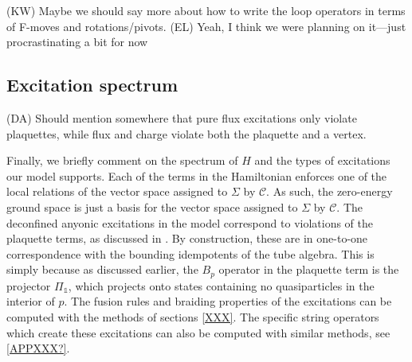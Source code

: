 \documentclass[12pt,a4paper]{article}
\newcounter{arrow}
\newcommand{\unit}{\mathds{1}}
\newcommand{\mcc}{\mathcal{C}}
\newcommand{\kw}[1]{{\color{kwcolor}\footnotesize{(KW) #1}}}
\newcommand{\dave}[1]{{\color{ao(english)}\footnotesize{(DA) #1}}}
\newcommand{\ethan}[1]{{\color{amethyst}\footnotesize{(EL) #1}}}
\newcommand{\Bpa}{\mathord{\vcenter{\hbox{\texttt{[image: Bpa.pdf]}}}}}
\newcommand{\Bpb}{\mathord{\vcenter{\hbox{\texttt{[image: Bpb.pdf]}}}}}
\newcommand{\Bpc}{\mathord{\vcenter{\hbox{\texttt{[image: Bpc.pdf]}}}}}
\newcommand{\Bpd}{\mathord{\vcenter{\hbox{\texttt{[image: Bpd.pdf]}}}}}
\newcommand{\Bpe}{\mathord{\vcenter{\hbox{\texttt{[image: Bpe.pdf]}}}}}
\newcommand{\Bpf}{\mathord{\vcenter{\hbox{\texttt{[image: Bpf.pdf]}}}}}
\newcommand{\Bpg}{\mathord{\vcenter{\hbox{\texttt{[image: Bpg.pdf]}}}}}
\newcommand{\Bph}{\mathord{\vcenter{\hbox{\texttt{[image: Bph.pdf]}}}}}
\newcommand{\Bpi}{\mathord{\vcenter{\hbox{\texttt{[image: Bpi.pdf]}}}}}
\newcommand{\PlaquettePrime}{\mathord{\vcenter{\hbox{\texttt{[image: PlaquettePrime.pdf]}}}}}
\begin{document}
\kw{Maybe we should say more about how to write the loop operators in terms of F-moves and rotations/pivots.}
\ethan{Yeah, I think we were planning on it---just procrastinating a bit for now}



\subsection{Excitation spectrum} \label{excitations_of_H}
\dave{Should mention somewhere that pure flux excitations only violate plaquettes, while flux and charge violate both the plaquette and a vertex.}

Finally, we briefly comment on the spectrum of $H$ and the types of excitations our model supports. 
Each of the terms in the Hamiltonian enforces one of the local relations of the vector space assigned to $\Sigma$ by $\mcc$. 
As such, the zero-energy ground space is just a basis for the vector space assigned to $\Sigma$ by $\mcc$.
The deconfined anyonic excitations in the model correspond to violations of the plaquette terms, as discussed in \cite{blah blah blah}.
By construction, these are in one-to-one correspondence with the bounding idempotents of the tube algebra. 
This is simply because as discussed earlier, the $B_p$ operator in the plaquette term is the projector $\Pi_\unit$, which projects onto states containing no quasiparticles in the interior of $p$. 
The fusion rules and braiding properties of the excitations can be computed with the methods of sections \ref{XXX}.
The specific string operators which create these excitations can also be computed with similar methods, see \ref{APPXXX?}.
\end{document}
